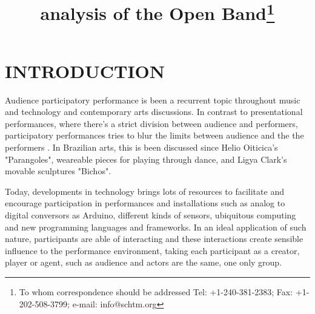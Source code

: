 \documentclass{aes2e}
\begin{document}

\title{analysis of the Open Band\thanks{To whom correspondence should be addressed Tel: +1-240-381-2383; Fax: +1-202-508-3799; e-mail: info@schtm.org}}




\maketitle

\section{INTRODUCTION}

Audience participatory performance is been a recurrent topic throughout music and technology and contemporary arts discussions. In contrast to presentational performances, where there's a strict division between audience and performers, participatory performances tries to blur the limits \cite{kattwinkel2003audience} between audience and the the performers  \cite{kattwinkel2003audience}.  In Brazilian arts, this is been discussed since Helio Oiticica's "Parangoles", weareable pieces for playing through dance, and Ligya Clark's movable sculptures "Bichos"\cite{Braga2008}. 

Today, developments in technology brings lots of resources to facilitate and encourage participation in performances and installations such as analog to digital conversors as Arduino, different kinds of sensors, ubiquitous computing and new programming languages and frameworks. In an ideal application of such nature, participants are able of interacting and these interactions create sensible influence to the performance environment, taking each participant as a creator, player or agent, such as audience and actors are the same, one only group\cite{Wu2017}.
\end{document}
